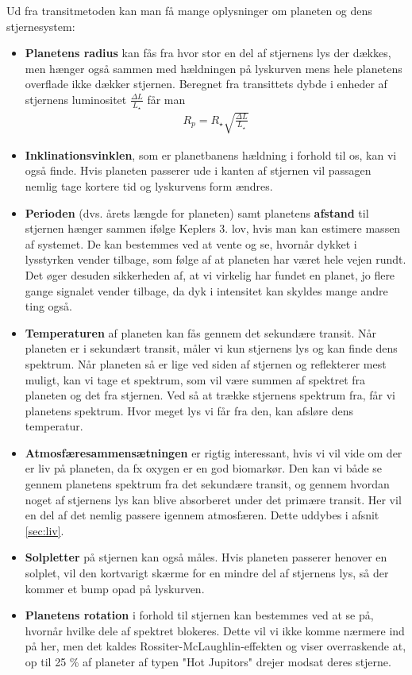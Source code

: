 Ud fra transitmetoden kan man få mange oplysninger om planeten og dens stjernesystem:
\begin{itemize}
    \item \textbf{Planetens radius} kan fås fra hvor stor en del af stjernens lys der dækkes, men hænger også sammen med hældningen på lyskurven mens hele planetens overflade ikke dækker stjernen. Beregnet fra transittets dybde i enheder af stjernens luminositet $\frac{\Delta L}{L_\star }$ får man
    \begin{align}
        R_p = R_\star  \sqrt{\frac{\Delta L}{L_\star }}
    \end{align}
    \item \textbf{Inklinationsvinklen}, som er planetbanens hældning i forhold til os, kan vi også finde. Hvis planeten passerer ude i kanten af stjernen vil passagen nemlig tage kortere tid og lyskurvens form ændres.
    \item \textbf{Perioden} (dvs. årets længde for planeten) samt planetens \textbf{afstand} til stjernen hænger sammen ifølge Keplers 3. lov, hvis man kan estimere massen af systemet. De kan bestemmes ved at vente og se, hvornår dykket i lysstyrken vender tilbage, som følge af at planeten har været hele vejen rundt. Det øger desuden sikkerheden af, at vi virkelig har fundet en planet, jo flere gange signalet vender tilbage, da dyk i intensitet kan skyldes mange andre ting også. %
    \item \textbf{Temperaturen} af planeten kan fås gennem det sekundære transit. Når planeten er i sekundært transit, måler vi kun stjernens lys og kan finde dens spektrum. Når planeten så er lige ved siden af stjernen og reflekterer mest muligt, kan vi tage et spektrum, som vil være summen af spektret fra planeten og det fra stjernen. Ved så at trække stjernens spektrum fra, får vi planetens spektrum. Hvor meget lys vi får fra den, kan afsløre dens temperatur.
    \item \textbf{Atmosfæresammensætningen} er rigtig interessant, hvis vi vil vide om der er liv på planeten, da fx oxygen er en god biomarkør. Den kan vi både se gennem planetens spektrum fra det sekundære transit, og gennem hvordan noget af stjernens lys kan blive absorberet under det primære transit. Her vil en del af det nemlig passere igennem atmosfæren. Dette uddybes i afsnit \ref{sec:liv}.
    \item \textbf{Solpletter} på stjernen kan også måles. Hvis planeten passerer henover en solplet, vil den kortvarigt skærme for en mindre del af stjernens lys, så der kommer et bump opad på lyskurven.
    \item \textbf{Planetens rotation} i forhold til stjernen kan bestemmes ved at se på, hvornår hvilke dele af spektret blokeres. Dette vil vi ikke komme nærmere ind på her, men det kaldes Rossiter-McLaughlin-effekten og viser overraskende at, op til 25 \% af planeter af typen "Hot Jupitors" drejer modsat deres stjerne. 
    \end{itemize}
    
